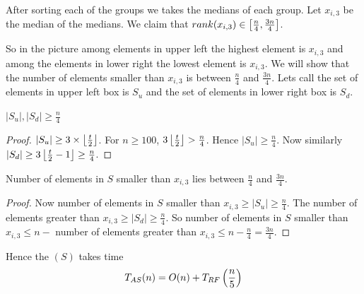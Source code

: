 After sorting each of the groups we takes the medians of each group. Let $x_{i,3}$ be the median of the medians. We claim that $rank(x_{i,3})\in  \left[\frac{n}{4},\frac{3n}{4}\right]$. 

\begin{algorithm}
	\DontPrintSemicolon
\caption{$(S)$}
\end{algorithm}

So in the picture among elements in upper left the highest element is $x_{i,3}$ and among the elements in lower right the lowest element is $x_{i,3}$. We will show that the number of elements smaller than $x_{i,3}$ is between $\frac{n}{4} $ and $\frac{3n}{4}$. Lets call the set of elements in upper left box is $S_u$ and the set of elements in lower right box is $S_d$.

\begin{lemma}{}{}
	$|S_u|,|S_d|\geq\frac{n}{4}$
\end{lemma}
\begin{proof}
	$|S_u|\geq 3\times \left\lfloor\frac{t}{2}\right\rfloor$. For $n\geq 100$, $3\left\lfloor\frac{t}{2}\right\rfloor> \frac{n}{4}$. Hence $|S_u|\geq \frac{n}{4}$. Now similarly $|S_d|\geq 3\left\lfloor\frac{t}{2}-1\right\rfloor\geq \frac{n}{4}$.
\end{proof}
\begin{lemma}{}{}
	Number of elements in $S$ smaller than $x_{i,3}$ lies between $\frac{n}4$ and $\frac{3n}{4}$.
\end{lemma}
\begin{proof}
	Now number of elements in $S$ smaller than $x_{i,3}\geq |S_u|\geq \frac{n}4$. The number of elements greater than $x_{i,3}\geq |S_d|\geq \frac{n}{4}$. So number of elements in $S$ smaller than $x_{i,3}\leq n-$ number of elements greater than $x_{i,3}\leq n-\frac{n}4=\frac{3n}{4}$.
\end{proof}
Hence the $(S)$ takes time $$T_{AS}(n)=O(n)+T_{RF}\left(\frac{n}{5}\right)$$
